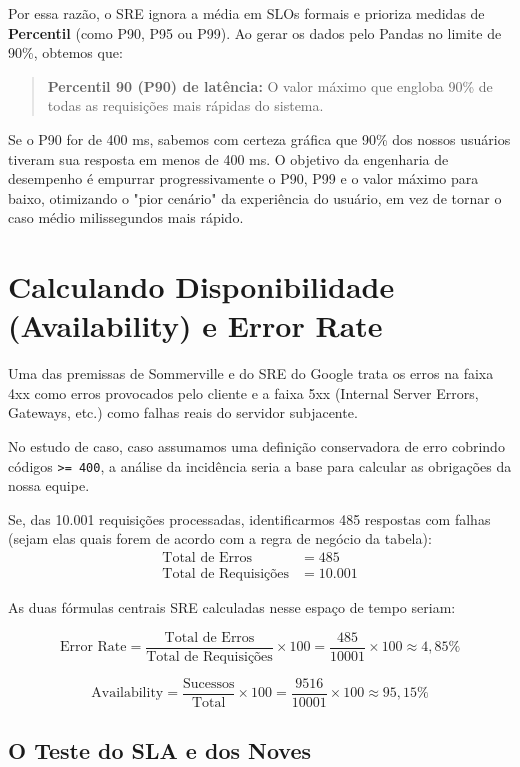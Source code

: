 \documentclass[12pt,a4paper,twoside]{report}
\begin{document}
Por essa razão, o SRE ignora a média em SLOs formais e prioriza medidas de \textbf{Percentil} (como P90, P95 ou P99). Ao gerar os dados pelo Pandas no limite de 90\%, obtemos que:
\begin{quote}
    \textbf{Percentil 90 (P90) de latência:} O valor máximo que engloba 90\% de todas as requisições mais rápidas do sistema.
\end{quote}

Se o P90 for de 400 ms, sabemos com certeza gráfica que 90\% dos nossos usuários tiveram sua resposta em menos de 400 ms. O objetivo da engenharia de desempenho é empurrar progressivamente o P90, P99 e o valor máximo para baixo, otimizando o "pior cenário" da experiência do usuário, em vez de tornar o caso médio milissegundos mais rápido.

\section{Calculando Disponibilidade (Availability) e Error Rate}

Uma das premissas de Sommerville e do SRE do Google trata os erros na faixa 4xx como erros provocados pelo cliente e a faixa 5xx (Internal Server Errors, Gateways, etc.) como falhas reais do servidor subjacente.

No estudo de caso, caso assumamos uma definição conservadora de erro cobrindo códigos \texttt{>= 400}, a análise da incidência seria a base para calcular as obrigações da nossa equipe.

Se, das 10.001 requisições processadas, identificarmos 485 respostas com falhas (sejam elas quais forem de acordo com a regra de negócio da tabela):
\begin{align*}
\text{Total de Erros} &= 485 \\
\text{Total de Requisições} &= 10.001
\end{align*}

As duas fórmulas centrais SRE calculadas nesse espaço de tempo seriam:

\[ \text{Error Rate} = \frac{\text{Total de Erros}}{\text{Total de Requisições}} \times 100 = \frac{485}{10001} \times 100 \approx 4,85\% \]

\[ \text{Availability} = \frac{\text{Sucessos}}{\text{Total}} \times 100 = \frac{9516}{10001} \times 100 \approx 95,15\% \]

\subsection{O Teste do SLA e dos Noves}
\end{document}
